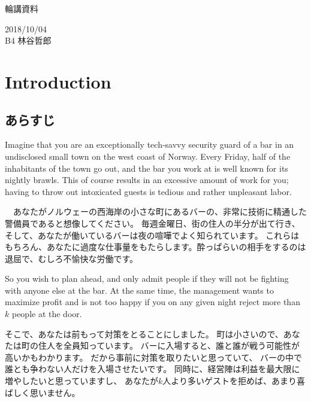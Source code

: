 \documentclass{jsarticle}
\begin{document}
\begin{center}
    {\large 輪講資料}\\

\end{center}
\begin{flushright}
    2018/10/04\\
    B4 林谷哲郎
\end{flushright}



\section{Introduction}

\subsection{あらすじ}
\begin{screen}
    Imagine that you are an exceptionally tech-savvy security guard of a bar in an undisclosed small town on the west coast of Norway. 
 Every Friday, half of the inhabitants of the town go out, and the bar you work at is well known for its nightly brawls. 
 This of course results in an excessive amount of work for you; having to throw out intoxicated guests is tedious and rather unpleasant labor. 

\end{screen}
　あなたがノルウェーの西海岸の小さな町にあるバーの、非常に技術に精通した警備員であると想像してください。
毎週金曜日、街の住人の半分が出て行き、そして、あなたが働いているバーは夜の喧嘩でよく知られています。
これらはもちろん、あなたに過度な仕事量をもたらします。酔っぱらいの相手をするのは退屈で、むしろ不愉快な労働です。



\begin{screen}
    So you wish to plan ahead, and only admit people if they will not be fighting with anyone else at the bar.
    At the same time, the management wants to maximize profit and is not too happy if you on any given night reject more than $k$ people at the door.  
\end{screen}
そこで、あなたは前もって対策をとることにしました。
町は小さいので、あなたは町の住人を全員知っています。
バーに入場すると、誰と誰が戦う可能性が高いかもわかります。
だから事前に対策を取りたいと思っていて、
バーの中で誰とも争わない人だけを入場させたいです。
同時に、経営陣は利益を最大限に増やしたいと思っていますし、
あなたが$k$人より多いゲストを拒めば、あまり喜ばしく思いません。
\end{document}

